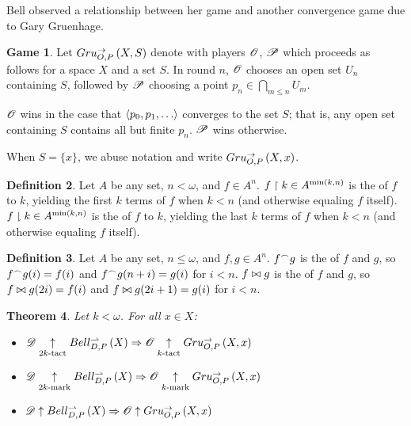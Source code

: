 \documentclass{amsart}
\newtheorem{theorem}{Theorem}[section]
\theoremstyle{definition}
\newtheorem{definition}[theorem]{Definition}
\newtheorem{game}[theorem]{Game}
\begin{document}
  Bell observed a relationship between her game and another convergence
  game due to Gary Gruenhage.

  \begin{game}
    Let \(Gru_{O,P}^{\to}\left({X},{S}\right)\) denote
     with
    players \(\mathscr{O}\), \(\mathscr{P}\) which proceeds as follows for a space
    \(X\) and a set \(S\). In round \(n\),
    \(\mathscr{O}\) chooses an open set \(U_n\) containing
    \(S\), followed by \(\mathscr{P}\)
    choosing a point \(p_n\in \bigcap_{m\leq n}U_m\).

    \(\mathscr{O}\) wins in the case that
    \(\<p_0,p_1,\dots\>\) converges to the set \(S\); that is,
    any open set containing \(S\) contains all but finite \(p_n\).
    \(\mathscr{P}\) wins otherwise.
  \end{game}

  When \(S=\{x\}\), we abuse notation and write
  \(Gru_{O,P}^{\to}\left({X},{x}\right)\).

  \begin{definition}
    Let \(A\) be any set, \(n<\omega\), and \(f\in A^n\).
    \(f\restriction k\in A^{\min(k,n)}\) is the  of \(f\)
    to \(k\), yielding the first \(k\) terms of
    \(f\) when \(k<n\) (and otherwise equaling \(f\) itself).
    \(f\downharpoonright k\in A^{\min(k,n)}\) is the  of \(f\)
    to \(k\), yielding the last \(k\) terms of
    \(f\) when \(k<n\) (and otherwise equaling \(f\) itself).
  \end{definition}

  \begin{definition}
    Let \(A\) be any set, \(n\leq\omega\), and \(f,g\in A^{n}\).
    \(f{^\frown} g\) is the  of \(f\) and \(g\), so
    \(f{^\frown} g(i)=f(i)\) and \(f{^\frown} g(n+i)=g(i)\) for \(i<n\).
    \(f\bowtie g\) is the  of \(f\) and \(g\), so
    \(f\bowtie g(2i)=f(i)\) and \(f\bowtie g(2i+1)=g(i)\) for \(i<n\).
  \end{definition}

  \begin{theorem}
    Let \(k<\omega\). For all \(x\in X\):
    \begin{itemize}
      \item
        \(
          \mathscr{D}\underset{2k\text{-tact}}{\uparrow} Bell_{D,P}^{\rightharpoonup}\left({X}\right)
            \Rightarrow
          \mathscr{O} \underset{k\text{-tact}}{\uparrow} Gru_{O,P}^{\to}\left({X},{x}\right)
        \)
      \item
        \(
          \mathscr{D}\underset{2k\text{-mark}}{\uparrow} Bell_{D,P}^{\rightharpoonup}\left({X}\right)
            \Rightarrow
          \mathscr{O} \underset{k\text{-mark}}{\uparrow} Gru_{O,P}^{\to}\left({X},{x}\right)
        \)
      \item
        \(
          \mathscr{D}\uparrow Bell_{D,P}^{\rightharpoonup}\left({X}\right)
            \Rightarrow
          \mathscr{O} \uparrow Gru_{O,P}^{\to}\left({X},{x}\right)
        \)
    \end{itemize}
  \end{theorem}
\end{document}
